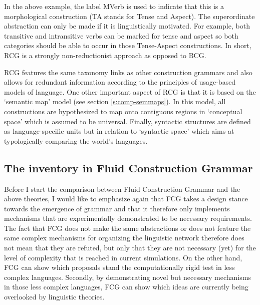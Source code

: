 \ea
{}
\z

In the above example, the label MVerb is used to indicate that this is a morphological construction (TA stands for Tense and Aspect). The superordinate abstraction can only be made if it is linguistically motivated. For example, both transitive and intransitive verbs can be marked for tense and aspect so both categories should be able to occur in those Tense-Aspect constructions. In short, RCG is a strongly non-reductionist approach as opposed to BCG.

RCG features the same taxonomy links as other construction grammars and also allows for redundant information according to the principles of usage-based models of language. One other important aspect of RCG is that it is based on the `semantic map' model (see section \ref{s:comp-semmaps}). In this model, all constructions are hypothesized to map onto contiguous regions in `conceptual space' which is assumed to be universal. Finally, syntactic structures are defined as language-specific units but in relation to `syntactic space' which aims at typologically comparing the world's languages.

\subsection{The inventory in Fluid Construction Grammar}

Before I start the comparison between Fluid Construction Grammar and the above theories, I would like to emphasize again that FCG takes a design stance towards the emergence of grammar and that it therefore only implements mechanisms that are experimentally demonstrated to be necessary requirements. The fact that FCG does not make the same abstractions or does not feature the same complex mechanisms for organizing the linguistic network therefore does not mean that they are refuted, but only that they are not necessary (yet) for the level of complexity that is reached in current simulations. On the other hand, FCG can show which proposals stand the computationally rigid test in less complex languages. Secondly, by demonstrating novel but necessary mechanisms in those less complex languages, FCG can show which ideas are currently being overlooked by linguistic theories.


